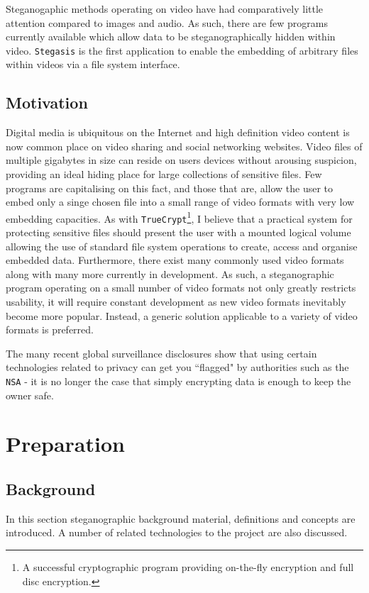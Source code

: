 \documentclass[paper=a4, fontsize=11pt,twoside]{scrartcl}    %
\numberwithin{table}{section}
\numberwithin{figure}{section}
\begin{document}
Steganogaphic methods operating on video have had comparatively little attention compared to images and audio. As such, there are few programs currently available which allow data to be steganographically hidden within video. \texttt{Stegasis} is the first application to enable the embedding of arbitrary files within videos via a file system interface.   



\subsection{Motivation}
Digital media is ubiquitous on the Internet and high definition video content is now common place on video sharing and social networking websites. Video files of multiple gigabytes in size can reside on users devices without arousing suspicion, providing an ideal hiding place for large collections of sensitive files. Few programs are capitalising on this fact, and those that are, allow the user to embed only a singe chosen file into a small range of video formats with very low embedding capacities. As with \texttt{TrueCrypt}\footnote{A successful cryptographic program providing on-the-fly encryption and full disc encryption.}, I believe that a practical system for protecting sensitive files should present the user with a mounted logical volume allowing the use of standard file system operations to create, access and organise embedded data. Furthermore, there exist many commonly used video formats along with many more currently in development. As such, a steganographic program operating on a small number of video formats not only greatly restricts usability, it will require constant development as new video formats inevitably become more popular. Instead, a generic solution applicable to a variety of video formats is preferred.

The many recent global surveillance disclosures show that using certain technologies related to privacy can get you ``flagged" by authorities such as the \texttt{NSA} - it is no longer the case that simply encrypting data is enough to keep the owner safe.

\section{Preparation}
\subsection{Background}
In this section steganographic background material, definitions and concepts are introduced. A number of related technologies to the project are also discussed.\\
\end{document}
